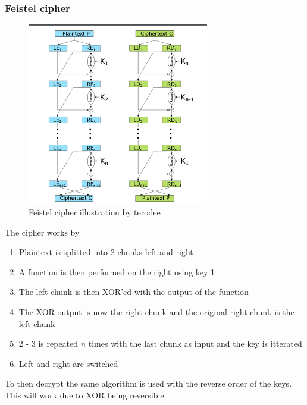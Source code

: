 \documentclass[12pt, a4paper]{article}
\begin{document}
			\subsubsection{Feistel cipher}
				\begin{figure}[h!]
					\includegraphics[width=300px]{assets/feistelCipher.png}
					\centering
					\caption{Feistel cipher illustration by \href{https://crypto.stackexchange.com/questions/67717/learning-about-feistel-cipher}{terodee}}
				\end{figure}
				The cipher works by
				\begin{enumerate}
					\item Plaintext is splitted into 2 chunks left and right
					\item A function is then performed on the right using key 1
					\item The left chunk is then XOR'ed with the output of the function
					\item The XOR output is now the right chunk and the original right chunk is the left chunk
					\item 2 - 3 is repeated $n$ times with the last chunk as input and the key is itterated
					\item Left and right are switched
				\end{enumerate}
				To then decrypt the same algorithm is used with the reverse order of the keys.\\
				This will work due to XOR being reversible
\end{document}
